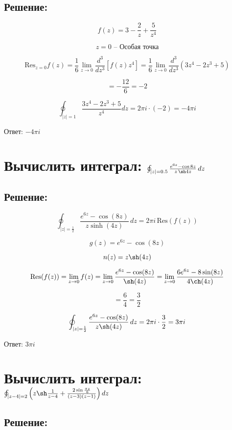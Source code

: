 \documentclass{article}
\begin{document}
\subsection{Решение:}

\[
f(z) = 3 - \frac{2}{z} + \frac{5}{z^4}
\]

\[
z = 0 \text{ – Особая точка}
\]

\[
\text{Res}_{z=0} f(z)= \frac{1}{6} \lim_{z \to 0} \frac{d^3}{dz^3} \left[ f(z) z^4 \right] = \frac{1}{6} \lim_{z \to 0} \frac{d^3}{dz^3} \left( 3z^4 - 2z^3 + 5 \right)
\]

\[
= - \frac{12}{6}  = - 2 
\]

\[
\oint_{|z|=1} \frac{3z^4 - 2z^3 + 5}{z^4} dz = 2 \pi i \cdot (- 2) =- 4 \pi i
\]


Ответ: $ - 4 \pi i $


\section{Вычислить интеграл: $\oint_{|z| = 0.5} \frac{e^{6z} - \cos 8z}{z \, \sh 4z} \, dz$}
\subsection{Решение:}

\[
\oint_{|z|=\frac{1}{2}} \frac{e^{6z} - \cos(8z)}{z \sinh(4z)} \, dz = 2 \pi i \, \text{Res}(f(z))
\]

\[
g(z) = e^{6z} - \cos(8z)
\]

\[
n(z) = z \sh(4z)
\]

\[
\text{Res}(f(z)) = \lim_{z \to 0} f(z)=  \lim_{z \to 0} \frac{e^{6z} - \cos(8z)}{\sh(4z)} = \lim_{z \to 0} \frac{6 e^{6z} - 8 \sin(8z)}{4 \ch(4z)}
\]

\[
= \frac{6}{4} = \frac{3}{2}
\]

\[
\oint_{|z|=\frac{1}{2}} \frac{e^{6z} - \cos(8z)}{z \sh(4z)} \, dz = 2 \pi i \cdot \frac{3}{2} = 3 \pi i
\]


Ответ: $3 \pi i $


\section{Вычислить интеграл: $\oint_{|z - 4| = 2} \left( z \sh \frac{1}{z - 4} + \frac{2 \sin \frac{\pi z}{6}}{(z - 3)(z - 1)} \right) dz$}
\subsection{Решение:}
\end{document}
